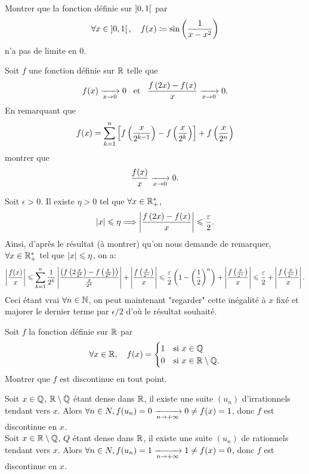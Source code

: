 \documentclass{magnolia}
\begin{document}
Montrer que la fonction définie sur $\left]0,1\right[$ par
\[\forall x\in\left]0,1\right[ ,\quad f(x)\coloneqq\sin\left(\frac{1}{x-x^2}\right)\]
n'a pas de limite en 0.

Soit $f$ une fonction définie sur $\mathbb{R}$ telle que
\[f(x)\xrightarrow[x\rightarrow 0]{}0 \quad\!\text{et}\quad\! \frac{f\left(2x\right)-f(x)}{x}\xrightarrow[x\rightarrow 0]{}0.\]
En remarquant que
\[f(x)=\sum_{k=1}^n \left[f\left(\frac{x}{2^{k-1}}\right)-f\left(\frac{x}{2^k}\right)\right] +
  f\left(\frac{x}{2^n}\right)\]
montrer que
\[\frac{f(x)}{x}\xrightarrow[x\rightarrow 0]{}0.\]

\begin{sol}
Soit $\epsilon>0$. Il existe $\eta>0$ tel que $\forall x\in \mathbb{R}_+^*$, $$\left|x\right|\leqslant \eta \Longrightarrow \left|\frac{f\left(2x\right)-f(x)}{x}\right|\leqslant \frac{\varepsilon}{2}.$$
Ainsi, d'après le résultat (à montrer) qu'on nous demande de remarquer, $\forall x \in \mathbb{R}_+^*$ tel que $\left|x\right|\leqslant \eta$, on a:
$$\left|\dfrac{f(x)}{x}\right|\leqslant \sum_{k=1}^n \frac{1}{2^k}\left|\frac{\left(f\left(2\frac{x}{2^{k}}\right)-f\left(\frac{x}{2^k}\right)\right)}{\frac{x}{2^k}}\right| +
  \left|\frac{f\left(\frac{x}{2^n}\right)}{x}\right|\leqslant \frac{\varepsilon}{2}\left(1-\left(\frac{1}{2}\right)^n\right)+\left|\frac{f\left(\frac{x}{2^n}\right)}{x}\right|\leqslant \frac{\varepsilon}{2}+ \left|\frac{f\left(\frac{x}{2^n}\right)}{x}\right|.$$
  Ceci étant vrai $\forall n \in \mathbb{N}$, on peut maintenant "regarder" cette inégalité à $x$ fixé et majorer le dernier terme par $\epsilon/2$ d'où le résultat souhaité.
\end{sol}


Soit $f$ la fonction définie sur $\mathbb{R}$ par
\[\forall x\in\mathbb{R} ,\quad f(x)=
  \begin{cases}
  1 & \text{si $x\in\mathbb{Q}$}\\
  0 & \text{si $x\in\mathbb{R}\setminus\mathbb{Q}$.}
  \end{cases}\]
Montrer que $f$ est discontinue en tout point.

\begin{sol}
  Soit $x\in \mathbb{Q}$, $\mathbb{R}\setminus\mathbb{Q}$ étant dense dans $\mathbb{R}$, il existe une suite $(u_n)$ d'irrationnels tendant vers $x$. Alors $\forall n \in N, f(u_n)=0\xrightarrow[n\rightarrow +\infty]{}0\neq f(x)=1$, donc $f$ est discontinue en $x$.\\
  Soit $x\in \mathbb{R}\setminus\mathbb{Q}$, $Q$ étant dense dans $\mathbb{R}$, il existe une suite $(u_n)$ de rationnels tendant vers $x$. Alors $\forall n \in N, f(u_n)=1\xrightarrow[n\rightarrow +\infty]{}1\neq f(x)=0$, donc $f$ est discontinue en $x$.
  \end{sol}
\end{document}
